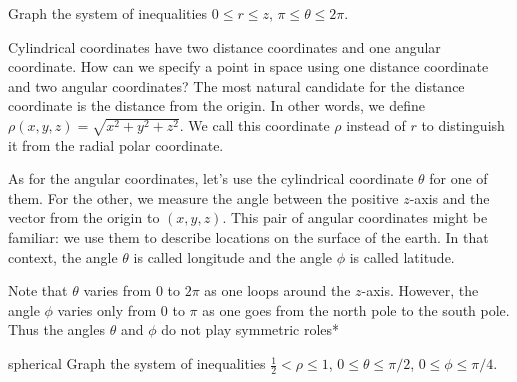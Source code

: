 \documentclass[svgnames]{report}
\begin{document}
\begin{exercise}{}{}
  Graph the system of inequalities $0 \leq r \leq z$, \: $\pi \leq \theta
  \leq 2\pi$. 
\end{exercise}

Cylindrical coordinates have two distance coordinates and one angular
coordinate. How can we specify a point in space using one distance
coordinate and two angular coordinates? The most natural candidate for
the distance coordinate is the distance from the origin. In other
words, we define $\rho(x,y,z) = \sqrt{x^2 + y^2 + z^2}$. We call this coordinate
$\rho$ instead of $r$ to distinguish it from the radial polar coordinate.

As for the angular coordinates, let's use the cylindrical coordinate
$\theta$ for one of them. For the other, we measure the angle between
the positive $z$-axis and the vector from the origin to
$(x,y,z)$. This pair of angular coordinates might be familiar: we use
them to describe locations on the surface of the earth. In that
context, the angle $\theta$ is called longitude and the angle $\phi$
is called latitude.

Note that $\theta$ varies from 0 to $2\pi$ as one loops around the
$z$-axis. However, the angle $\phi$ varies only from 0 to $\pi$ as one
goes from the north pole to the south pole. Thus the
angles $\theta$ and $\phi$ do not play symmetric roles*

\begin{example}{}{spherical}
  Graph the system of inequalities $\tfrac{1}{2} < \rho \leq 1$, \: $0
  \leq \theta \leq \pi/2$, \: $0 \leq \phi \leq \pi/4$. 
\end{example}
\end{document}

